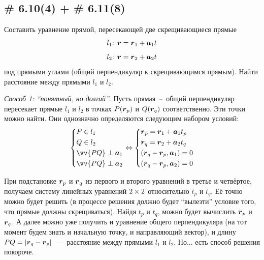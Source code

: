 \documentclass[a4paper,12pt]{article}
\begin{document}
  
  
  \subsection{\# 6.10(4) + \# 6.11(8)}
  
  \begin{problem}
    Составить уравнение прямой, пересекающей две скрещивающиеся прямые
    \[
      l_1\colon \boldsymbol r = \boldsymbol r_1 + \boldsymbol a_1 t
    \]
    \[
      l_2\colon \boldsymbol r = \boldsymbol r_2 + \boldsymbol a_2 t
    \]
    под прямыми углами (общий перпендикуляр к скрещивающимся прямым).
    Найти расстояние между прямыми $l_1$ и $l_2$.
  \end{problem}
  
  \begin{solution}
    \leavevmode
    
    \emph{Способ 1: ``понятный, но долгий''}.
    Пусть прямая~--~общий перпендикуляр пересекает прямые $l_1$ и $l_2$ в точках $P(\boldsymbol r_p)$ и $Q(\boldsymbol r_q)$ соответственно.
    Эти точки можно найти.
    Они однозначно определяются следующим набором условий:
    \[
      \left\{
        \begin{aligned}
          &P \in l_1\\
          &Q \in l_2\\
          &\vv{PQ} \perp \bds a_1\\
          &\vv{PQ} \perp \bds a_2
        \end{aligned}
      \right.
      \Leftrightarrow \left\{
        \begin{aligned}
          &\bds r_p = \bds r_1 + \bds a_1 t_p\\
          &\bds r_q = \bds r_2 + \bds a_2 t_q\\
          &(\bds r_q - \bds r_p, \bds a_1) = 0\\
          &(\bds r_q - \bds r_p, \bds a_2) = 0
        \end{aligned}
      \right.
    \]
    
    При подстановке $\boldsymbol r_p$ и $\boldsymbol r_q$ из первого и второго уравнений в третье и четвёртое, получаем систему линейных уравнений $2 \hm\times 2$ относительно $t_p$ и $t_q$.
    Её точно можно будет решить (в процессе решения должно будет ``вылезти'' условие того, что прямые должны скрещиваться).
    Найдя $t_p$ и $t_q$, можно будет вычислить $\boldsymbol r_p$ и $\boldsymbol r_q$.
    А далее можно уже получить и уравнение общего перпендикуляра (на тот момент будем знать и начальную точку, и направляющий вектор), и длину $PQ \hm= |\bds r_q \hm- \bds r_p|$~---~расстояние между прямыми $l_1$ и $l_2$.
    Но... есть способ решения покороче.
    

\end{solution}
\end{document}
